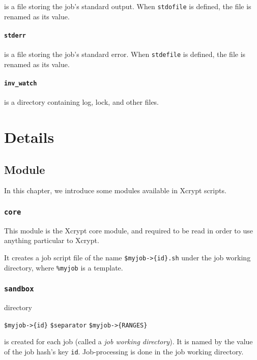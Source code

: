 \documentclass[a4paper,10pt]{report}
\begin{document}
is a file storing the job's standard output.  When \texttt{stdofile}
is defined, the file is renamed as its value.

\subsection*{\texttt{stderr}}

is a file storing the job's standard error.  When \texttt{stdefile}
is defined, the file is renamed as its value.

\subsection*{\texttt{inv\_watch}}

is a directory containing log, lock, and other files.

\part{Details}

\chapter{Module}\label{chapmodule}

In this chapter, we introduce some modules available in Xcrypt scripts.

\section{\texttt{core}}

This module is the Xcrypt core module, and required to be read in
order to use anything particular to Xcrypt.

It creates a job script file of the name \texttt{\$myjob->\{id\}.sh}
under the job working directory, where \texttt{\%myjob} is a template.

\section{\texttt{sandbox}}

directory

\begin{center}
 \texttt{\$myjob->\{id\}} \texttt{\$separator}
 \texttt{\$myjob->\{RANGES\}}
\end{center}

is created for each job (called a \textit{job working directory}).  It is
named by the value of the job hash's key \texttt{id}.  Job-processing
is done in the job working directory.
\end{document}
